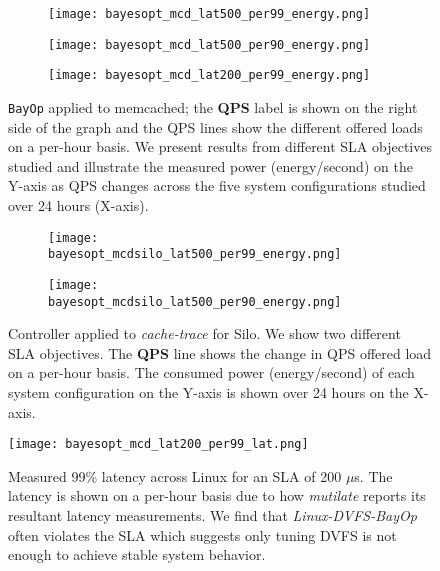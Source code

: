 \begin{figure}[!htb]
\centering
\begin{subfigure}{.45\textwidth}
  \centering
  \texttt{[image: bayesopt\_mcd\_lat500\_per99\_energy.png]}
\end{subfigure}
\begin{subfigure}{.45\textwidth}
  \centering
  \texttt{[image: bayesopt\_mcd\_lat500\_per90\_energy.png]}
\end{subfigure}
\begin{subfigure}{.45\textwidth}
  \centering
  \texttt{[image: bayesopt\_mcd\_lat200\_per99\_energy.png]}
\end{subfigure}%
\caption{\small \texttt{BayOp} applied to memcached; the \textbf{QPS} label is shown on the right side of the graph and the QPS lines show the different offered loads on a per-hour basis. We present results from different SLA objectives studied and illustrate the measured power (energy/second) on the Y-axis as QPS changes across the five system configurations studied over 24 hours (X-axis).}
\label{fig:mcd_bayop}
\vspace{-0.1in}
\end{figure}

\begin{figure*}[ht!]
\centering
\begin{subfigure}{.49\textwidth}
  \texttt{[image: bayesopt\_mcdsilo\_lat500\_per99\_energy.png]}
\end{subfigure}
\begin{subfigure}{.49\textwidth}
  \texttt{[image: bayesopt\_mcdsilo\_lat500\_per90\_energy.png]}
\end{subfigure}
\caption{\small Controller applied to \textit{cache-trace} for Silo. We show two different SLA objectives. The \textbf{QPS} line shows the change in QPS offered load on a per-hour basis. The consumed power (energy/second) of each system configuration on the Y-axis is shown over 24 hours on the X-axis.}
\label{fig:mcdsilo_bayop}
\vspace{-0.15in}
\end{figure*}

\begin{figure}[h!]
\centering
    \texttt{[image: bayesopt\_mcd\_lat200\_per99\_lat.png]}
    \caption{\small Measured 99\% latency across Linux for an SLA of 200 $\mu$s. The latency is shown on a per-hour basis due to how \textit{mutilate} reports its resultant latency measurements. We find that \textit{Linux-DVFS-BayOp} often violates the SLA which suggests only tuning DVFS is not enough to achieve stable system behavior.}
    \label{fig:bayesopt_mcd_lat200_per99_lat}
    \vspace{-0.25in}
\end{figure}

